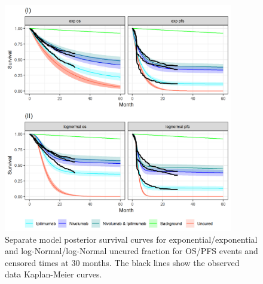 \documentclass[AMA,STIX1COL]{WileyNJD-v2}
\begin{document}




\begin{figure}[!H]
\centering
\includegraphics[height=10cm, width=0.6\linewidth]{plot_S_grid_cf_sep_cpt_30m.png}
\caption{\label{fig:S_cutpoint_30mo_sep} Separate model posterior survival curves for exponential/exponential and log-Normal/log-Normal uncured fraction for OS/PFS events and censored times at 30 months. The black lines show the observed data Kaplan-Meier curves.}
\end{figure}
\end{document}

